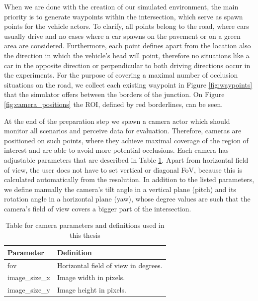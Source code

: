 When we are done with the creation of our simulated environment, the main priority is to generate waypoints within the intersection, which serve as spawn points for the vehicle actors. To clarify, all points belong to the road, where cars usually drive and no cases where a car spawns on the pavement or on a green area are considered. Furthermore, each point defines apart from the location also the direction in which the vehicle's head will point, therefore no situations like a car in the opposite direction or perpendicular to both driving directions occur in the experiments. For the purpose of covering a maximal number of occlusion situations on the road, we collect each existing waypoint in Figure \ref{fig:waypoints} that the simulator offers between the borders of the junction. On Figure \ref{fig:camera_positions} the ROI, defined by red borderlines, can be seen.

At the end of the preparation step we spawn a camera actor which should monitor all scenarios and perceive data for evaluation. Therefore, cameras are positioned on such points, where they achieve maximal coverage of the region of interest and are able to avoid more potential occlusions. Each camera has adjustable parameters that are described in Table \ref{tab:camera_params}. Apart from horizontal field of view, the user does not have to set vertical or diagonal FoV, because this is calculated automatically from the resolution. In addition to the listed parameters, we define manually the camera's tilt angle in a vertical plane (pitch) and its rotation angle in a horizontal plane (yaw), whose degree values are such that the camera's field of view covers a bigger part of the intersection. 
\begin{table}[h]
\caption{Table for camera parameters and definitions used in this thesis\label{tab:camera_params}}
\centering
    \begin{tabular}{ | l | p{5cm} |}
    \hline
    Parameter & Definition  \\ \hline
    fov & Horizontal field of view in degrees. \\ \hline
    image\_size\_x & Image width in pixels. \\ \hline
    image\_size\_y & Image height in pixels. \\ \hline
    \end{tabular}
\end{table}

